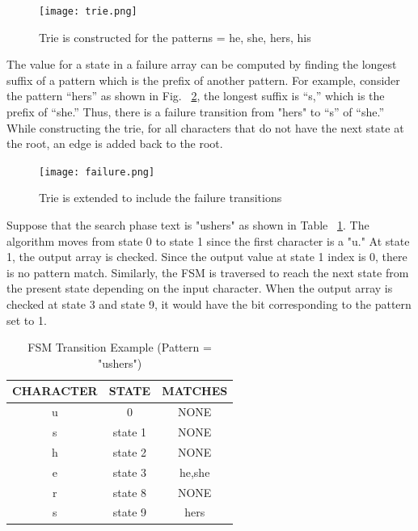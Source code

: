 \begin{figure}[H]
	\centering
	\texttt{[image: trie.png]}
	\caption{Trie is constructed for the patterns = {he, she, hers, his}}
	\label{fig:trie}
\end{figure}
\squeezeup

The value for a state in a failure array can be computed by finding the longest suffix of a pattern which is the prefix of another pattern. For example, consider the pattern “hers” as shown in Fig. ~\ref{fig:failure}, the longest suffix is “s,” which is the prefix of “she.” Thus, there is a failure transition from "hers" to “s” of “she.” While constructing the trie, for all characters that do not have the next state at the root, an edge is added back to the root. 

\begin{figure}[H]
	\centering
	\texttt{[image: failure.png]}
	\caption{Trie is extended to include the failure transitions}
	\label{fig:failure}
\end{figure}
\squeezeup

Suppose that the search phase text is "ushers" as shown in Table ~\ref{tab:search}. The algorithm moves from state 0 to state 1 since the first character is a "u." At state 1, the output array is checked. Since the output value at state 1 index is 0, there is no pattern match. Similarly, the FSM is traversed to reach the next state from the present state depending on the input character. When the output array is checked at state 3 and state 9, it would have the bit corresponding to the pattern set to 1.

\begin {table}[H]
\centering
\caption {FSM Transition Example (Pattern = "ushers")} \label{tab:search}
	\begin{tabular}{|c|c|c|}
	\midrule
	CHARACTER & STATE & MATCHES\\
	\midrule
	u & 0 & NONE\\
	\midrule
	s & state 1 &  NONE\\
	\midrule
	h & state 2 & NONE\\
	\midrule
	e & state 3 & {he,she}\\
	\midrule
	r & state 8 & NONE\\
	\midrule
	s & state 9 & {hers}\\
	\midrule
\end{tabular}
\end{table}
\squeezeup

